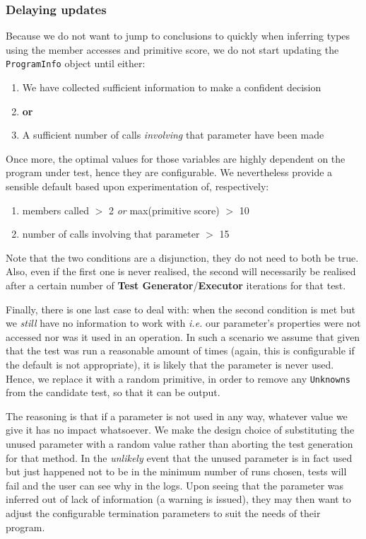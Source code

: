 \subsubsection{Delaying updates}
Because we do not want to jump to conclusions to quickly when inferring types using the member accesses and primitive score, we do not start updating the \texttt{ProgramInfo} object until either:

\begin{enumerate}
   \item We have collected sufficient information to make a confident decision
   \item[] \textbf{or}
   \item A sufficient number of calls \emph{involving} that parameter have been made
\end{enumerate}

Once more, the optimal values for those variables are highly dependent on the program under test, hence they are configurable. We nevertheless provide a sensible default based upon experimentation of, respectively:

\begin{enumerate}
   \item members called \(>\) 2 \emph{or} max(primitive score) \(>\) 10
   \item number of calls involving that parameter \(>\) 15
\end{enumerate}

Note that the two conditions are a disjunction, they do not need to both be true. Also, even if the first one is never realised, the second will necessarily be realised after a certain number of \textbf{Test Generator}/\textbf{Executor} iterations for that test.

Finally, there is one last case to deal with: when the second condition is met but we \emph{still} have no information to work with \emph{i.e.} our parameter's properties were not accessed nor was it used in an operation. In such a scenario we assume that given that the test was run a reasonable amount of times (again, this is configurable if the default is not appropriate), it is likely that the parameter is never used. Hence, we replace it with a random primitive, in order to remove any \texttt{Unknowns} from the candidate test, so that it can be output.

The reasoning is that if a parameter is not used in any way, whatever value we give it has no impact whatsoever. We make the design choice of substituting the unused parameter with a random value rather than aborting the test generation for that method. In the \emph{unlikely} event that the unused parameter is in fact used but just happened not to be in the minimum number of runs chosen, tests will fail and the user can see why in the logs. Upon seeing that the parameter was inferred out of lack of information (a warning is issued), they may then want to adjust the configurable termination parameters to suit the needs of their program.

